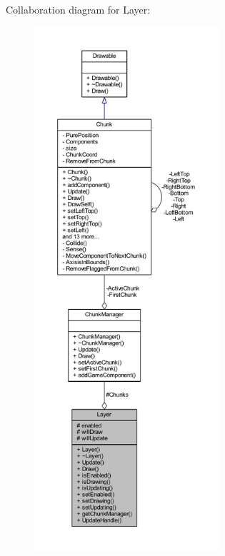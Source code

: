 Collaboration diagram for Layer\-:\nopagebreak
\begin{figure}[H]
\begin{center}
\leavevmode
\includegraphics[height=550pt]{class_layer__coll__graph}
\end{center}
\end{figure}
